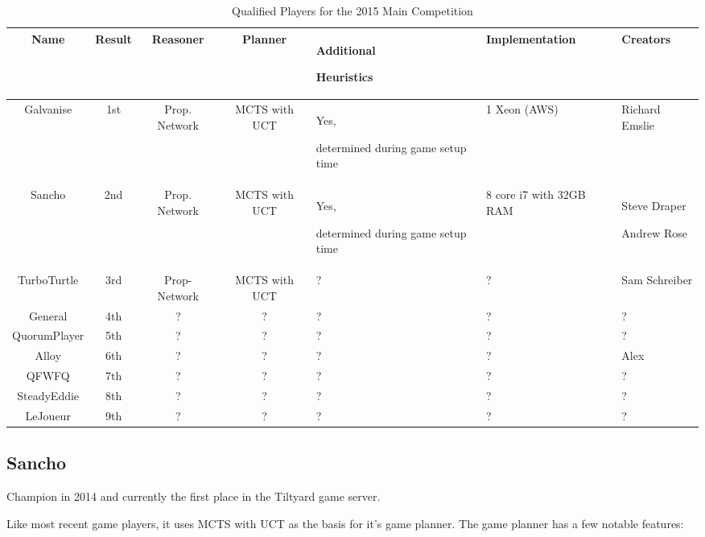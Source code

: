 \begin{table}[h]
\caption{Qualified Players for the 2015 Main Competition}
\label{2015 World Competition}
\small
\begin{tabular}{| c | c | c | c | p{2.5cm} | p{2.5cm} | p{2.5cm} |}
\hline  Name & Result & Reasoner & Planner & Additional \par Heuristics & Implementation & Creators \\
\hline  Galvanise & 1st & Prop. Network & MCTS with UCT & Yes, \par determined during game setup time & 1 Xeon (AWS) & Richard Emslie \\
\hline  Sancho & 2nd & Prop. Network & MCTS with UCT & Yes, \par determined during game setup time & 8 core i7 with 32GB RAM & Steve Draper \par Andrew Rose \\
\hline  TurboTurtle & 3rd & Prop- Network & MCTS with UCT & ? & ? & Sam Schreiber \\
\hline  General & 4th & ? & ? & ? & ? & ? \\ %
\hline  QuorumPlayer & 5th & ? & ? & ? & ? & ? \\ %
\hline  Alloy & 6th & ? & ? & ? & ? & Alex \\ %
\hline  QFWFQ & 7th & ? & ? & ? & ? & ? \\ %
\hline  SteadyEddie & 8th & ? & ? & ? & ? & ? \\ %
\hline  LeJoueur & 9th & ? & ? & ? & ? & ? \\ %

\hline
\end{tabular}
\end{table}


\subsection{Sancho}
\label{ssc:Sancho}
Champion in 2014 and currently the first place in the Tiltyard game server.

Like most recent game players, it uses \gls{MCTS} with \gls{UCT} as the  basis for it's game planner. The game planner has a few notable features: 

